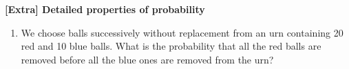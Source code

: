 \documentclass[12pt]{article}%
\newcommand{\0}{{\bf 0}}
\begin{document}
\begin{center}
{\Large\bf [Extra] Detailed properties of probability} 
\end{center}






\begin{enumerate}


\item 
We choose balls successively without replacement 
from an urn containing 20 red  and 10 blue balls. 
What is the probability that all the red balls are removed before all the blue ones are removed from the urn? 


\end{enumerate}
\end{document}
